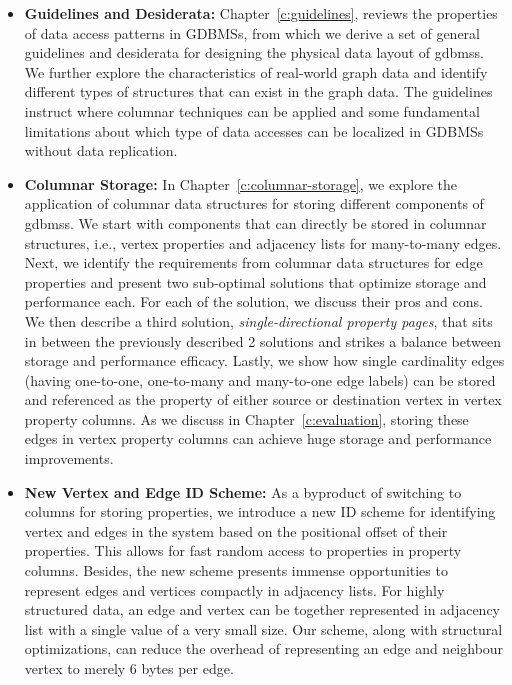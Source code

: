 \begin{itemize}
	\item \textbf{Guidelines and Desiderata:} Chapter~\ref{c:guidelines}, reviews the properties of data access patterns in GDBMSs, from which we derive a set of general guidelines and desiderata for designing the physical data layout of \gls{gdbms}s. We further explore the characteristics of real-world graph data and identify different types of structures that can exist in the graph data. The guidelines instruct where columnar techniques can be applied and some fundamental limitations about which type of data accesses can be localized in GDBMSs without data replication.
	
	\item \textbf{Columnar Storage:} In Chapter~\ref{c:columnar-storage}, we explore the application of columnar data structures for storing different components of \gls{gdbms}s. We start with components that can directly be stored in columnar structures, i.e., vertex properties and adjacency lists for many-to-many edges. Next, we identify the requirements from columnar data structures for edge properties and present two sub-optimal solutions that optimize storage and performance each. For each of the solution, we discuss their pros and cons. We then describe a third solution, \emph{single-directional property pages}, that sits in between the previously described 2 solutions and strikes a balance between storage and performance efficacy. Lastly, we show how single cardinality edges (having one-to-one, one-to-many and many-to-one edge labels) can be stored and referenced as the property of either source or destination vertex in vertex property columns. As we discuss in Chapter~\ref{c:evaluation}, storing these edges in vertex property columns can achieve huge storage and performance improvements.
	
	\item \textbf{New Vertex and Edge ID Scheme:} As a byproduct of switching to columns for storing properties, we introduce a new ID scheme for identifying vertex and edges in the system based on the positional offset of their properties. This allows for fast random access to properties in property columns. Besides, the new scheme presents immense opportunities to represent edges and vertices compactly in adjacency lists. For highly structured data, an edge and vertex can be together represented in adjacency list with a single value of a very small size. Our scheme, along with structural optimizations, can reduce the overhead of representing an edge and neighbour vertex to merely 6 bytes per edge.
	

\end{itemize}
